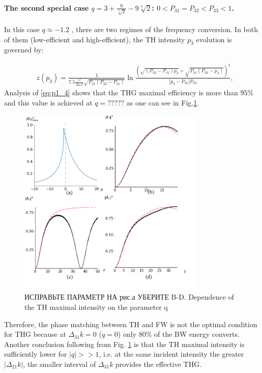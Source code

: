 \documentclass[a4paper, 12pt, onecolumn]{extarticle}
\begin{document}
\paragraph*{The second special case $q=3+\frac{9}{\sqrt[3]{2}}-9\sqrt[3]{2}$: $0<P_{31}=P_{32}<P_{33}<1$.}
In this case $q\approx-1.2$ , there are two regimes of the frequency conversion. In both of them (low-efficient and high-efficient), the TH intensity $p_3$ evolution is governed  by:

\begin{equation}
\label{eq:p1_4}
\begin{aligned}
&z(p_3)=\frac{1}{7.5\frac{\gamma^2}{\Delta_{21}k}\sqrt{P_{31}(P_{33}-P_{31})}}\ln\frac{\left(\sqrt{(P_{33}-P_{31})p_3}+\sqrt{P_{31}(P_{33}-p_3)}\right)^2}{|p_3-P_{31}|P_{33}},
\end{aligned}
\end{equation}
Analysis of \eqref{eq:p1_4} shows that the THG maximal efficiency is more than $95\%$ and this value is achieved at $q=?????$ as one can see in Fig.\ref{fr:cglp}.
\begin{figure}
    \centering
    \includegraphics[width=0.8\textwidth, height=0.4\textheight]{CGLP.png}
\caption{ИСПРАВЬТЕ ПАРАМЕТР НА рис.а УБЕРИТЕ B-D. Dependence of the TH maximal intensity on the parameter q }
\label{fr:cglp}
\end{figure}
Therefore, the phase matching between TH and FW is not the optimal condition for THG because at $\Delta_{31}k=0$ ($q=0$) only $80\%$ of the BW energy converts. Another conclusion following from Fig. \ref{fr:cglp} is that the TH maximal intensity is sufficiently lower for $|q|>>1$, i.e. at the same incident intensity the greater $|\Delta_{21}k|$, the smaller interval of $\Delta_{31}k$ provides the effective THG.
\end{document}
